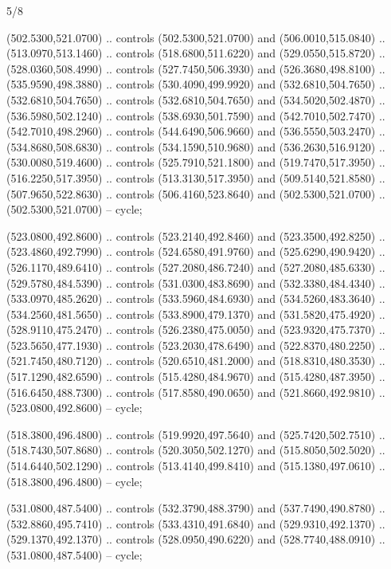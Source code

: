\begin{flagdescription}{5/8}
\begin{scope}[shift={(m)}]
\begin{scope}[scale=\flagwidth/220,y=0.1mm, x=0.1mm, yscale=-1,shift={(-596,-360)}]
\begin{scope}[draw=black,line join=round,line cap=round,line width=0.381\lw]
\begin{scope}[fill=olive]
\end{scope}
\begin{scope}[fill=red]
 (502.5300,521.0700) .. controls (502.5300,521.0700) and
  (506.0010,515.0840) .. (513.0970,513.1460) .. controls (518.6800,511.6220) and
  (529.0550,515.8720) .. (528.0360,508.4990) .. controls (527.7450,506.3930) and
  (526.3680,498.8100) .. (535.9590,498.3880) .. controls (530.4090,499.9920) and
  (532.6810,504.7650) .. (532.6810,504.7650) .. controls (532.6810,504.7650) and
  (534.5020,502.4870) .. (536.5980,502.1240) .. controls (538.6930,501.7590) and
  (542.7010,502.7470) .. (542.7010,498.2960) .. controls (544.6490,506.9660) and
  (536.5550,503.2470) .. (534.8680,508.6830) .. controls (534.1590,510.9680) and
  (536.2630,516.9120) .. (530.0080,519.4600) .. controls (525.7910,521.1800) and
  (519.7470,517.3950) .. (516.2250,517.3950) .. controls (513.3130,517.3950) and
  (509.5140,521.8580) .. (507.9650,522.8630) .. controls (506.4160,523.8640) and
  (502.5300,521.0700) .. (502.5300,521.0700) -- cycle;

 (523.0800,492.8600) .. controls (523.2140,492.8460) and
  (523.3500,492.8250) .. (523.4860,492.7990) .. controls (524.6580,491.9760) and
  (525.6290,490.9420) .. (526.1170,489.6410) .. controls (527.2080,486.7240) and
  (527.2080,485.6330) .. (529.5780,484.5390) .. controls (531.0300,483.8690) and
  (532.3380,484.4340) .. (533.0970,485.2620) .. controls (533.5960,484.6930) and
  (534.5260,483.3640) .. (534.2560,481.5650) .. controls (533.8900,479.1370) and
  (531.5820,475.4920) .. (528.9110,475.2470) .. controls (526.2380,475.0050) and
  (523.9320,475.7370) .. (523.5650,477.1930) .. controls (523.2030,478.6490) and
  (522.8370,480.2250) .. (521.7450,480.7120) .. controls (520.6510,481.2000) and
  (518.8310,480.3530) .. (517.1290,482.6590) .. controls (515.4280,484.9670) and
  (515.4280,487.3950) .. (516.6450,488.7300) .. controls (517.8580,490.0650) and
  (521.8660,492.9810) .. (523.0800,492.8600) -- cycle;

\end{scope}
\begin{scope}[fill=white]
 (518.3800,496.4800) .. controls (519.9920,497.5640) and
  (525.7420,502.7510) .. (518.7430,507.8680) .. controls (520.3050,502.1270) and
  (515.8050,502.5020) .. (514.6440,502.1290) .. controls (513.4140,499.8410) and
  (515.1380,497.0610) .. (518.3800,496.4800) -- cycle;

 (531.0800,487.5400) .. controls (532.3790,488.3790) and
  (537.7490,490.8780) .. (532.8860,495.7410) .. controls (533.4310,491.6840) and
  (529.9310,492.1370) .. (529.1370,492.1370) .. controls (528.0950,490.6220) and
  (528.7740,488.0910) .. (531.0800,487.5400) -- cycle;


\end{scope}
\end{scope}
\end{scope}
\end{scope}
\end{flagdescription}
